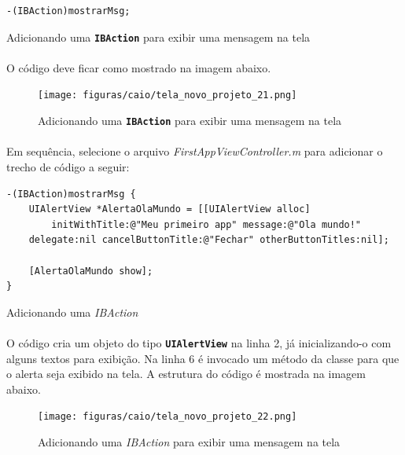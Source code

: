 \documentclass[a4paper,12pt,brazil,doubleside]{book}
\begin{document}
\begin{singlespace}
\begin{listing}
\begin{verbatim}
-(IBAction)mostrarMsg;
\end{verbatim}
\caption{Adicionando uma \texttt{\textbf{IBAction}} para exibir uma mensagem na tela}
\end{listing}

\paragraph{}O código deve ficar como mostrado na imagem abaixo.

\begin{figure}[H]
  \centering
  \texttt{[image: figuras/caio/tela\_novo\_projeto\_21.png]}
  \caption{Adicionando uma \texttt{\textbf{IBAction}} para exibir uma mensagem na tela}
  \label{fig:a}
\end{figure}

\paragraph{}Em sequência, selecione o arquivo \emph{FirstAppViewController.m} para adicionar o  trecho de código a seguir:

\begin{listing}
\begin{verbatim}
-(IBAction)mostrarMsg {
    UIAlertView *AlertaOlaMundo = [[UIAlertView alloc] 
    	initWithTitle:@"Meu primeiro app" message:@"Ola mundo!" 
	delegate:nil cancelButtonTitle:@"Fechar" otherButtonTitles:nil];
    
	[AlertaOlaMundo show];
}
\end{verbatim}
\caption{Adicionando uma \emph{IBAction}}
\end{listing}

\paragraph{}O código cria um objeto do tipo \texttt{\textbf{UIAlertView}} na linha 2, já inicializando-o com alguns textos para exibição. Na linha 6 é invocado um método da classe para que o alerta seja exibido na tela. A estrutura do código é mostrada na imagem abaixo.

\begin{figure}[H]
  \centering
  \texttt{[image: figuras/caio/tela\_novo\_projeto\_22.png]}
  \caption{Adicionando uma \emph{IBAction} para exibir uma mensagem na tela}
  \label{fig:a}
\end{figure}


\end{singlespace}
\end{document}
